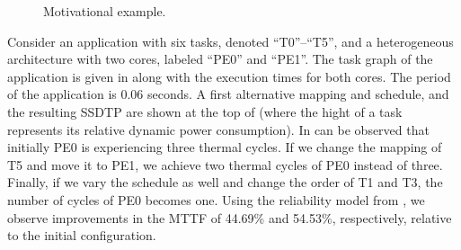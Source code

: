 \begin{figure}[t]
  \centering


  \caption{Motivational example.}
\end{figure}

Consider an application with six tasks, denoted ``T0''--``T5'', and a heterogeneous architecture with two cores, labeled ``PE0'' and ``PE1''. The task graph of the application is given in  along with the execution times for both cores. The period of the application is 0.06 seconds. A first alternative mapping and schedule, and the resulting SSDTP are shown at the top of  (where the hight of a task represents its relative dynamic power consumption). In can be observed that initially PE0 is experiencing three thermal cycles. If we change the mapping of T5 and move it to PE1, we achieve two thermal cycles of PE0 instead of three. Finally, if we vary the schedule as well and change the order of T1 and T3, the number of cycles of PE0 becomes one. Using the reliability model from , we observe improvements in the MTTF of 44.69\% and 54.53\%, respectively, relative to the initial configuration.
